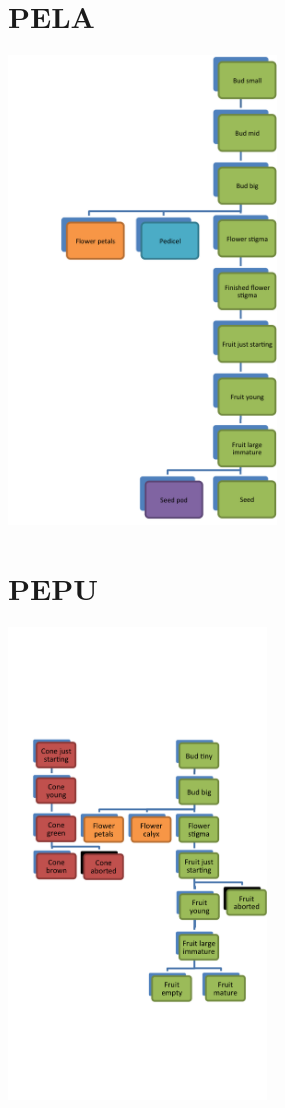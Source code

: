 \documentclass[10pt]{book} %
\begin{document}
\section{PELA}
\begin{multicols}{2}
\includegraphics[width=2.8in]{images/PELA.png}
\vfill
\columnbreak

\end{multicols}



\clearpage
\newpage
\section{PEPU}
\begin{multicols}{2}
\includegraphics[width=2.7in]{images/PEPU.png}
\vfill
\columnbreak

\end{multicols}
\clearpage
\newpage
\end{document}
